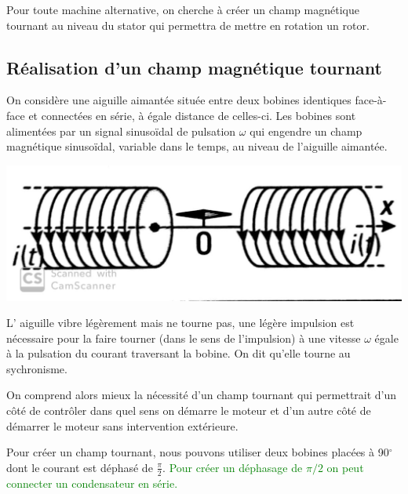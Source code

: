 \documentclass{article}
\begin{document}

Pour toute machine alternative, on cherche à créer un champ magnétique tournant au niveau du stator qui permettra de mettre en rotation un rotor. 

\subsection{Réalisation d'un champ magnétique tournant}
On considère une aiguille aimantée située entre deux bobines identiques face-à-face et connectées en série, à égale distance de celles-ci. Les bobines sont alimentées par un signal sinusoïdal de pulsation $\omega$ qui engendre un champ magnétique sinusoïdal, variable dans le temps, au niveau de l'aiguille aimantée. 


\begin{center}
    \includegraphics[scale=0.18]{2bobinesface.jpg}
\end{center}


L' aiguille vibre légèrement mais ne tourne pas, une légère impulsion est nécessaire pour la faire tourner (dans le sens de l'impulsion) à une vitesse $\omega$ égale à la pulsation du courant traversant la bobine. On dit qu'elle tourne au sychronisme. 

On comprend alors mieux la nécessité d'un champ tournant qui permettrait d'un côté de contrôler dans quel sens on démarre le moteur et d'un autre côté de démarrer le moteur sans intervention extérieure. 

\medskip

Pour créer un champ tournant, nous pouvons utiliser deux bobines placées à 90$^\circ$ dont le courant est déphasé de $\frac{\pi}{2}$. \textcolor{green}{Pour créer un déphasage de $\pi /2$ on peut connecter un condensateur en série.} 
\end{document}
